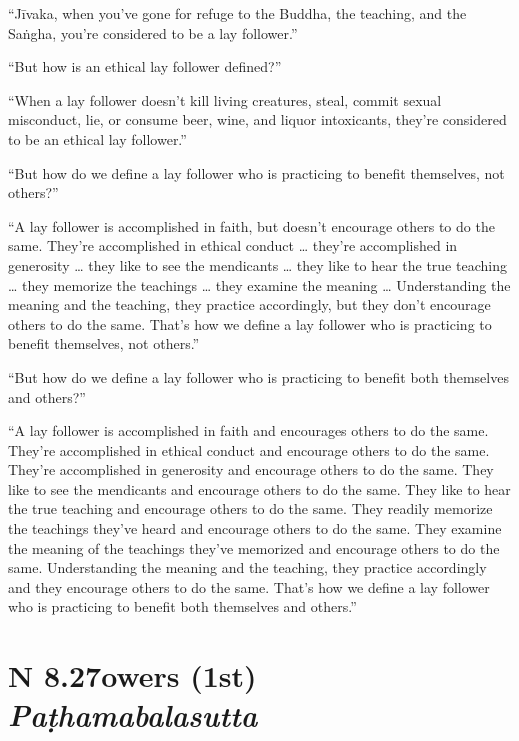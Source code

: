 \documentclass[12pt,openany]{book}%
\newcommand*{\suttatitleacronym}[1]{\smaller[2]{#1}\vspace*{.3em}}
\newcommand*{\suttatitletranslation}[1]{\linebreak{#1}}
\newcommand*{\suttatitleroot}[1]{\linebreak\smaller[2]\itshape{#1}}
\newcommand*{\tocacronym}[1]{\hspace*{-3.3em}{#1}\quad}
\newcommand*{\toctranslation}[1]{#1}
\newcommand*{\tocroot}[1]{(\textit{#1})}
\begin{document}
“\textsanskrit{Jīvaka}, when you’ve gone for refuge to the Buddha, the teaching, and the \textsanskrit{Saṅgha}, you’re considered to be a lay follower.” 

“But how is an ethical lay follower defined?” 

“When a lay follower doesn’t kill living creatures, steal, commit sexual misconduct, lie, or consume beer, wine, and liquor intoxicants, they’re considered to be an ethical lay follower.” 

“But how do we define a lay follower who is practicing to benefit themselves, not others?” 

“A lay follower is accomplished in faith, but doesn’t encourage others to do the same. They’re accomplished in ethical conduct … they’re accomplished in generosity … they like to see the mendicants … they like to hear the true teaching … they memorize the teachings … they examine the meaning … Understanding the meaning and the teaching, they practice accordingly, but they don’t encourage others to do the same. That’s how we define a lay follower who is practicing to benefit themselves, not others.” 

“But how do we define a lay follower who is practicing to benefit both themselves and others?” 

“A lay follower is accomplished in faith and encourages others to do the same. They’re accomplished in ethical conduct and encourage others to do the same. They’re accomplished in generosity and encourage others to do the same. They like to see the mendicants and encourage others to do the same. They like to hear the true teaching and encourage others to do the same. They readily memorize the teachings they’ve heard and encourage others to do the same. They examine the meaning of the teachings they’ve memorized and encourage others to do the same. Understanding the meaning and the teaching, they practice accordingly and they encourage others to do the same. That’s how we define a lay follower who is practicing to benefit both themselves and others.” 

%
\section*{{\suttatitleacronym AN 8.27}{\suttatitletranslation Powers (1st) }{\suttatitleroot Paṭhamabalasutta}}
\addcontentsline{toc}{section}{\tocacronym{AN 8.27} \toctranslation{Powers (1st) } \tocroot{Paṭhamabalasutta}}
\end{document}
